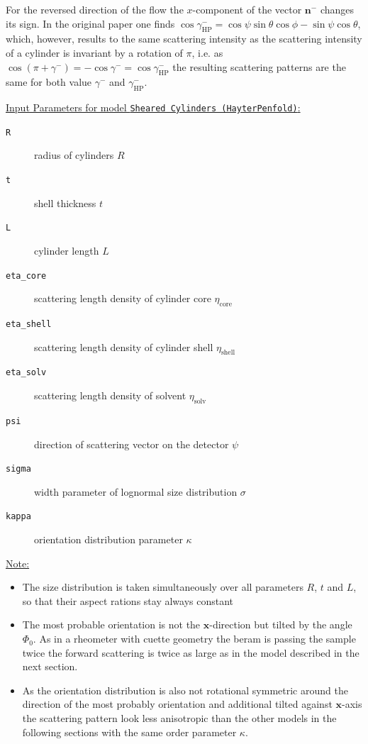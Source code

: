 For the reversed direction of the flow the $x$-component of the vector $\mathbf{n}^-$ changes its sign. In the original paper \cite{Hayter1984} one finds $\cos \gamma^-_\mathrm{HP} = \cos\psi \sin\theta \cos\phi - \sin\psi \cos\theta$, which, however, results to the same scattering intensity as the scattering intensity of a cylinder is invariant by a rotation of $\pi$, i.e. as $\cos(\pi+\gamma^-) =-\cos\gamma^- = \cos\gamma^-_\mathrm{HP}$ the resulting scattering patterns are the same for both value $\gamma^-$ and $\gamma^-_\mathrm{HP}$.

\vspace{5mm}

\uline{Input Parameters for model \texttt{Sheared Cylinders (HayterPenfold)}:}\\
\begin{description}
\item[\texttt{R}] radius of cylinders $R$
\item[\texttt{t}] shell thickness $t$
\item[\texttt{L}] cylinder length $L$
\item[\texttt{eta\_core}] scattering length density of cylinder core $\eta_\mathrm{core}$
\item[\texttt{eta\_shell}] scattering length density of cylinder shell $\eta_\mathrm{shell}$
\item[\texttt{eta\_solv}] scattering length density of solvent $\eta_\mathrm{solv}$
\item[\texttt{psi}] direction of scattering vector on the detector $\psi$
\item[{\texttt{sigma}}] width parameter of lognormal size distribution $\sigma$
\item[{\texttt{kappa}}] orientation distribution parameter $\kappa$
\end{description}

\uline{Note:}
\begin{itemize}
\item The size distribution is taken simultaneously over all parameters $R$, $t$ and $L$, so that their aspect rations stay always constant
\item The most probable orientation is not the $\mathbf{x}$-direction but tilted by the angle $\varPhi_0$. As in a rheometer with cuette geometry the beram is passing the sample twice the forward scattering is twice as large as in the model described in the next section.
\item As the orientation distribution is also not rotational symmetric around the direction of the most probably orientation and additional tilted against $\mathbf{x}$-axis the scattering pattern look less anisotropic than the other models in the following sections with the same order parameter $\kappa$.
\end{itemize}

